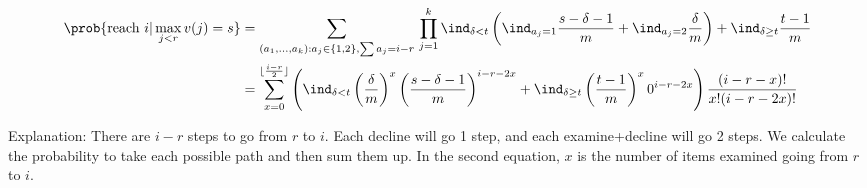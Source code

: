 \begin{align}
  \prob{\text{reach }i|\max_{j<r}v(j)= s}
  &= \sum_{(a_1,\dots,a_k):a_j\in\{1,2\},\sum a_j = i-r} \,\prod_{j=1}^k 
  \ind_{\delta<t}
  \left(\ind_{a_j = 1}\frac{s-\delta-1}{m}
  +\ind_{a_j = 2}\frac{\delta}{m}
  \right)
  +\ind_{\delta\geq t}\frac{t-1}{m}
  \\
  &= \sum_{x=0}^{\lfloor\frac{i-r}{2}\rfloor} 
  \left(
  		\ind_{\delta<t}\left(\frac{\delta}{m}\right)^x\left(\frac{s-\delta-1}{m}\right)^{i-r-2x}
  		+\ind_{\delta \geq t} \left(\frac{t-1}{m}\right)^x 0^{i-r-2x}
  \right)
  \frac{(i-r-x)!}{x!(i-r-2x)!}
\end{align}

Explanation: There are $i-r$ steps to go from $r$ to $i$. Each decline will go 1 step, and each examine+decline will go 2 steps. We calculate the probability to take each possible path and then sum them up. In the second equation, $x$ is the number of items examined going from $r$ to $i$.
